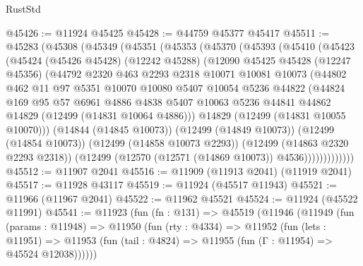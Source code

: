 \begin{lexlean}{RustStd}
\begin{coremodule}
@45426 := @11924 @45425
@45428 := @44759 @45377 @45417
@45511 := @45283
    (@45308
      (@45349
        (@45351
          (@45353
            (@45370
              (@45393
                (@45410
                  (@45423
                    (@45424
                      (@45426 @45428)
                      (@12242 @45288)
                      (@12090
                        @45425
                        @45428
                        (@12247 @45356)
                        (@44792
                          @2320
                          @463
                          @2293
                          @2318
                          @10071
                          @10081
                          @10073
                          (@44802
                            @462
                            @11
                            @97
                            @5351
                            @10070
                            @10080
                            @5407
                            @10054
                            @5236
                            @44822
                            (@44824
                              @169
                              @95
                              @57
                              @6961
                              @4886
                              @4838
                              @5407
                              @10063
                              @5236
                              @44841
                              @44862
                              @14829
                              (@12499 (@14831 @10064 @4886)))
                            @14829
                            (@12499 (@14831 @10055 @10070)))
                          (@14844 (@14845 @10073))
                          (@12499 (@14849 @10073))
                          (@12499 (@14854 @10073))
                          (@12499 (@14858 @10073 @2293))
                          (@12499 (@14863 @2320 @2293 @2318))
                          (@12499 (@12570 (@12571 (@14869 @10073)) @4536)))))))))))))
@45512 := @11907 @2041
@45516 := @11909 (@11913 @2041) (@11919 @2041)
@45517 := @11928 @43117
@45519 := @11924 (@45517 @11943)
@45521 := @11966 (@11967 @2041)
@45522 := @11962 @45521
@45524 := @11924 (@45522 @11991)
@45541 := @11923
    (fun (fn : @131) =>
    @45519
      (@11946
        (@11949
          (fun (params : @11948) =>
          @11950
            (fun (rty : @4334) =>
            @11952
              (fun (lets : @11951) =>
              @11953 (fun (tail : @4824) => @11955 (fun (Γ : @11954) => @45524 @12038))))))

\end{coremodule}
\end{lexlean}
